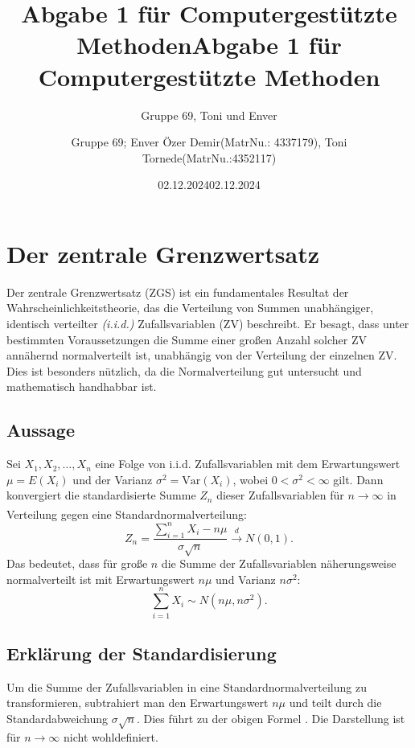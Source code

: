 \documentclass{article}
\title{Abgabe 1 für Computergestützte Methoden}
\author{Gruppe 69, Toni und Enver }
\date{02.12.2024}
\title{Abgabe 1 für Computergestützte Methoden}
\author{Gruppe 69; Enver Özer Demir(MatrNu.: 4337179),
Toni Tornede(MatrNu.:4352117)}
\date{02.12.2024}
\newcommand{\redboxlink}[2]{\textsuperscript{\hyperlink{#1}{\fbox{\textcolor{red}{#2}}}}}
\begin{document}
\maketitle
\tableofcontents
\newpage


\section{Der zentrale Grenzwertsatz}
\label{sec:zgs}

Der zentrale Grenzwertsatz (ZGS) ist ein fundamentales Resultat der Wahrscheinlichkeitstheorie, das die Verteilung von Summen unabhängiger, identisch verteilter \textit{(i.i.d.)} Zufallsvariablen (ZV) beschreibt. Er besagt, dass unter bestimmten Voraussetzungen die Summe einer großen Anzahl solcher ZV annähernd normalverteilt ist, unabhängig von der Verteilung der einzelnen ZV. Dies ist besonders nützlich, da die Normalverteilung gut untersucht und mathematisch handhabbar ist.

\subsection{Aussage}
Sei $X_1, X_2, \dots, X_n$ eine Folge von i.i.d. Zufallsvariablen mit dem Erwartungswert $\mu = E(X_i)$ und der Varianz $\sigma^2 = \text{Var}(X_i)$, wobei $0 < \sigma^2 < \infty$ gilt. Dann konvergiert die standardisierte Summe $Z_n$ dieser Zufallsvariablen für $n \to \infty$ in Verteilung gegen eine Standardnormalverteilung:\redboxlink{zgs1}{1} 
\begin{equation}
Z_n = \frac{\sum_{i=1}^n X_i - n\mu}{\sigma \sqrt{n}} \overset{d}{\to} N(0,1). \tag{1}
\end{equation}
Das bedeutet, dass für große $n$ die Summe der Zufallsvariablen näherungsweise normalverteilt ist mit Erwartungswert $n\mu$ und Varianz $n\sigma^2$:
\begin{equation}
\sum_{i=1}^n X_i \sim N(n\mu, n\sigma^2). \tag{2}
\end{equation}

\subsection{Erklärung der Standardisierung}
\label{zgs1}
Um die Summe der Zufallsvariablen in eine Standardnormalverteilung zu transformieren, subtrahiert man den Erwartungswert $n\mu$ und teilt durch die Standardabweichung $\sigma \sqrt{n}$. Dies führt zu der obigen Formel \hyperlink{zgs1}{\fbox{\textcolor{red}{(1)}}}. Die Darstellung \hyperlink{zgs2}{\fbox{\textcolor{red}{(2)}}} ist für $n \to \infty$ nicht wohldefiniert.
\end{document}
